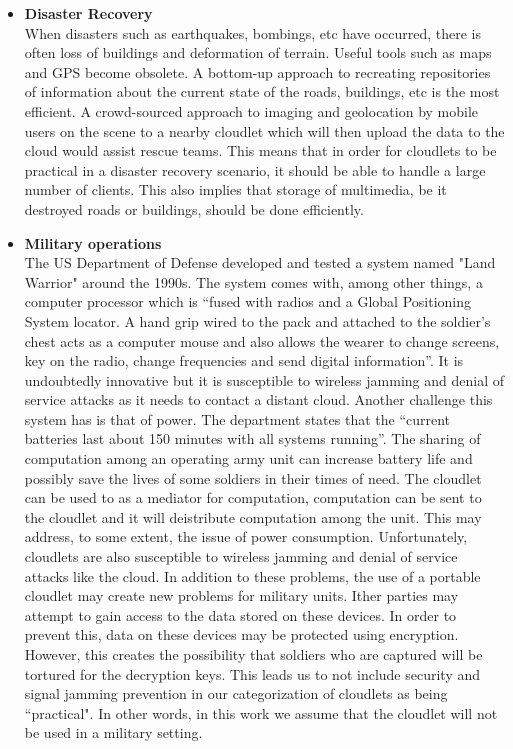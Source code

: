 \begin{itemize}

\item \textbf{Disaster Recovery} \\ When disasters such as earthquakes, bombings, etc have occurred, there is often loss of buildings and deformation of terrain. Useful tools such as maps and GPS become obsolete. A bottom-up approach to recreating repositories of information about the current state of the roads, buildings, etc is the most efficient. A crowd-sourced approach to imaging and geolocation by mobile users on the scene to a nearby cloudlet which will then upload the data to the cloud would assist rescue teams. This means that in order for cloudlets to be practical in a disaster recovery scenario, it should be able to handle a large number of clients. This also implies that storage of multimedia, be it destroyed roads or buildings, should be done efficiently.

\item \textbf{Military operations} \\ The US Department of Defense developed and tested a system named "Land Warrior" around the 1990s\cite{usdefense}. The system comes with, among other things, a computer processor which is ``fused with radios and a Global Positioning System locator. A hand grip wired to the pack and attached to the soldier's chest acts as a computer mouse and also allows the wearer to change screens, key on the radio, change frequencies and send digital information''\cite{usdefense}. It is undoubtedly innovative but it is susceptible to wireless jamming and denial of service attacks as it needs to contact a distant cloud. Another challenge this system has is that of power. The department states that the ``current batteries last about 150 minutes with all systems running''\cite{usdefense}. The sharing of computation among an operating army unit can increase battery life and possibly save the lives of some soldiers in their times of need. The cloudlet can be used to as a mediator for computation, computation can be sent to the cloudlet and it will deistribute computation among the unit. This may address, to some extent, the issue of power consumption. Unfortunately, cloudlets are also susceptible to wireless jamming and denial of service attacks like the cloud. In addition to these problems, the use of a portable cloudlet may create new problems for military units. Ither parties may attempt to gain access to the data stored on these devices. In order to prevent this, data on these devices may be protected using encryption. However, this creates the possibility that soldiers who are captured will be tortured for the decryption keys. This leads us to not include security and signal jamming prevention in our categorization of cloudlets as being ``practical". In other words, in this work we assume that the cloudlet will not be used in a military setting.
\end{itemize}

